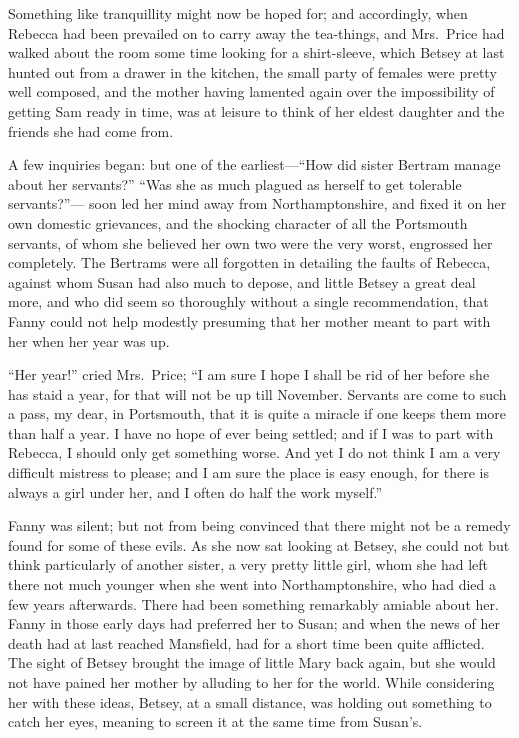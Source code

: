 Something like tranquillity might now be hoped for;
and accordingly, when Rebecca had been prevailed on
to carry away the tea-things, and Mrs.\ Price had walked
about the room some time looking for a shirt-sleeve, which
Betsey at last hunted out from a drawer in the kitchen,
the small party of females were pretty well composed,
and the mother having lamented again over the impossibility
of getting Sam ready in time, was at leisure to think
of her eldest daughter and the friends she had come from.

A few inquiries began:  but one of the earliest---``How did
sister Bertram manage about her servants?''  ``Was she
as much plagued as herself to get tolerable servants?''---%
soon led her mind away from Northamptonshire, and fixed it
on her own domestic grievances, and the shocking character
of all the Portsmouth servants, of whom she believed her
own two were the very worst, engrossed her completely.
The Bertrams were all forgotten in detailing the faults
of Rebecca, against whom Susan had also much to depose,
and little Betsey a great deal more, and who did seem
so thoroughly without a single recommendation, that Fanny
could not help modestly presuming that her mother meant
to part with her when her year was up.

``Her year!'' cried Mrs.\ Price; ``I am sure I hope I
shall be rid of her before she has staid a year,
for that will not be up till November.  Servants are come
to such a pass, my dear, in Portsmouth, that it is quite
a miracle if one keeps them more than half a year.
I have no hope of ever being settled; and if I was to
part with Rebecca, I should only get something worse.
And yet I do not think I am a very difficult mistress
to please; and I am sure the place is easy enough,
for there is always a girl under her, and I often do half
the work myself.''

Fanny was silent; but not from being convinced that there
might not be a remedy found for some of these evils.
As she now sat looking at Betsey, she could not but think
particularly of another sister, a very pretty little girl,
whom she had left there not much younger when she went
into Northamptonshire, who had died a few years afterwards.
There had been something remarkably amiable about her.
Fanny in those early days had preferred her to Susan;
and when the news of her death had at last reached Mansfield,
had for a short time been quite afflicted.  The sight
of Betsey brought the image of little Mary back again,
but she would not have pained her mother by alluding to her
for the world.  While considering her with these ideas,
Betsey, at a small distance, was holding out something to
catch her eyes, meaning to screen it at the same time from
Susan's.

